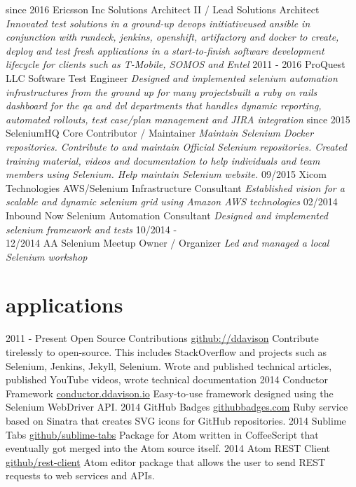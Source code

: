 \documentclass[]{ddavison-resume}
\begin{document}
\begin{entrylist}
  \entry
         {since 2016}
         {Ericsson Inc}
         {Solutions Architect II / Lead Solutions Architect}
         {\emph{Innovated test solutions in a ground-up devops initiative\bullet used ansible in conjunction with rundeck, jenkins, openshift, artifactory and docker to create, deploy and test fresh applications in a start-to-finish software development lifecycle for clients such as T-Mobile, SOMOS and Entel}}
  \entry
  	{2011 - 2016}
  	{ProQuest LLC}
  	{Software Test Engineer}
  	{\emph{Designed and implemented selenium automation infrastructures from the ground up for many projects\bullet built a ruby on rails dashboard for the qa and dvl departments that handles dynamic reporting, automated rollouts, test case/plan management and JIRA integration}} 
  \entry
  	{since 2015}
  	{SeleniumHQ}
  	{Core Contributor / Maintainer}
  	{\emph{Maintain Selenium Docker repositories.  Contribute to and maintain Official Selenium repositories. Created training material, videos and documentation to help individuals and team members using Selenium.  Help maintain Selenium website.}}
  \entry
  	{09/2015}
  	{Xicom Technologies}
  	{AWS/Selenium Infrastructure Consultant}
  	{\emph{Established vision for a scalable and dynamic selenium grid using Amazon AWS technologies}}
  \entry
  	{02/2014}
  	{Inbound Now}
  	{Selenium Automation Consultant}
  	{\emph{Designed and implemented selenium framework and tests}}
  \entry
  	{10/2014 - \\
  	12/2014}
  	{AA Selenium Meetup}
  	{Owner / Organizer}
  	{\emph{Led and managed a local Selenium workshop}}
\end{entrylist}

\section{applications}

\begin{entrylist}
  \entry
    {2011 - Present}
    {Open Source Contributions}
    {\href{https://github.com/ddavison}{github://ddavison}}
    {Contribute tirelessly to open-source.  This includes StackOverflow and projects such as Selenium, Jenkins, Jekyll, Selenium. Wrote and published technical articles, published YouTube videos, wrote technical documentation}
  \entry
    {2014}
    {Conductor Framework}
    {\href{https://conductor.ddavison.io}{conductor.ddavison.io}}
    {Easy-to-use framework designed using the Selenium WebDriver API.}
  \entry
    {2014}
    {GitHub Badges}
    {\href{https://github.com/ddavison/github-badges}{githubbadges.com}}
    {Ruby service based on Sinatra that creates SVG icons for GitHub repositories.}
  \entry
    {2014}
    {Sublime Tabs}
    {\href{https://github.com/ddavison/sublime-tabs}{github/sublime-tabs}}
    {Package for Atom written in CoffeeScript that eventually got merged into the Atom source itself.}
  \entry
  	{2014}
  	{Atom REST Client}
  	{\href{https://github.com/ddavison/rest-client}{github/rest-client}}
  	{Atom editor package that allows the user to send REST requests to web services and APIs.}
\end{entrylist}
\end{document}

